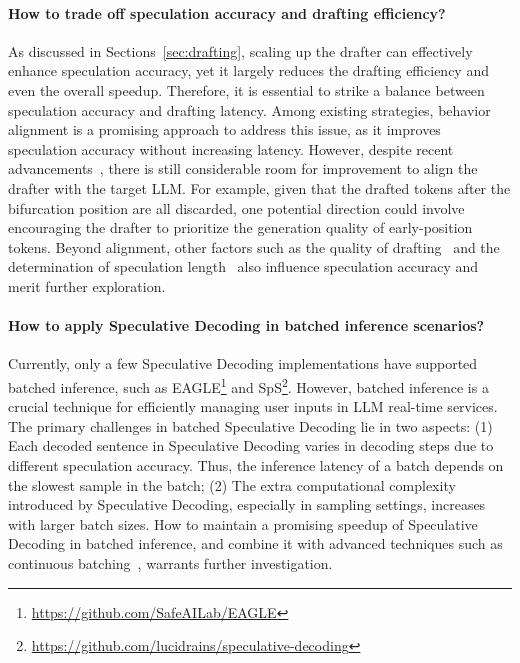\paragraph{How to trade off speculation accuracy and drafting efficiency?} As discussed in Sections~\ref{sec:drafting}, scaling up the drafter can effectively enhance speculation accuracy, yet it largely reduces the drafting efficiency and even the overall speedup. Therefore, it is essential to strike a balance between speculation accuracy and drafting latency. Among existing strategies, behavior alignment is a promising approach to address this issue, as it improves speculation accuracy without increasing latency. However, despite recent advancements~\cite{Miao:2023specinfer, Zhou:2023distillspec, Liu:2023onlinespec}, there is still considerable room for improvement to align the drafter with the target LLM. For example, given that the drafted tokens after the bifurcation position are all discarded, one potential direction could involve encouraging the drafter to prioritize the generation quality of early-position tokens. Beyond alignment, other factors such as the quality of drafting~\cite{Fu:2023lookahead} and the determination of speculation length~\cite{Su:2023batching} also influence speculation accuracy and merit further exploration.

\paragraph{How to apply Speculative Decoding in batched inference scenarios?} Currently, only a few Speculative Decoding implementations have supported batched inference, such as EAGLE\footnote{\url{https://github.com/SafeAILab/EAGLE}} and SpS\footnote{\url{https://github.com/lucidrains/speculative-decoding}}. However, batched inference is a crucial technique for efficiently managing user inputs in LLM real-time services. The primary challenges in batched Speculative Decoding lie in two aspects: (1) Each decoded sentence in Speculative Decoding varies in decoding steps due to different speculation accuracy. Thus, the inference latency of a batch depends on the slowest sample in the batch; (2) The extra computational complexity introduced by Speculative Decoding, especially in sampling settings, increases with larger batch sizes. How to maintain a promising speedup of Speculative Decoding in batched inference, and combine it with advanced techniques such as continuous batching~\cite{Yu:2022continuousbatching}, warrants further investigation.

